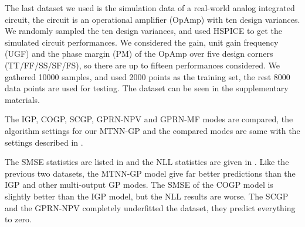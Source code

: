 The last dataset we used is the simulation data of a real-world analog integrated circuit, the circuit is an operational amplifier (OpAmp) with ten design variances. We randomly sampled the ten design variances, and used HSPICE to get the simulated circuit performances. We considered the gain, unit gain frequency (UGF) and the phase margin (PM) of the OpAmp over five design corners (TT/FF/SS/SF/FS), so there are up to fifteen performances considered. We gathered 10000 samples, and used 2000 points as the training set, the rest 8000 data points are used for testing. The dataset can be seen in the supplementary materials.


The IGP, COGP, SCGP, GPRN-NPV and GPRN-MF modes are compared, the algorithm settings for our MTNN-GP and the compared modes are same with the settings described in . 


The SMSE statistics are listed in  and the NLL statistics are given in . Like the previous two datasets, the MTNN-GP model give far better predictions than the IGP and other multi-output GP modes. The SMSE of the COGP model is slightly better than the IGP model, but the NLL results are worse. The SCGP and the GPRN-NPV completely underfitted the dataset, they predict everything to zero.

